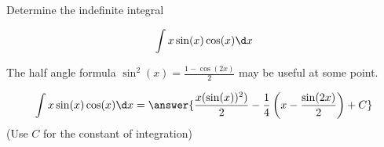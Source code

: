\documentclass{ximera}
\author{Jason Miller}
\begin{document}
\begin{exercise}
Determine the indefinite integral 

\[
\int x\sin(x) \cos(x) \d x
\]

The half angle formula $\sin^{2}(x)= \frac{1-\cos(2x)}{2}$ may be useful at some point. 

\[
\int x \sin(x) \cos(x) \d x= \answer{  \frac{x (\sin(x))^{2})}{2} -\frac{1}{4} \left( x- \frac{ \sin(2x)}{2} \right) +C} 
\]
(Use $C$ for the constant of integration)

\end{exercise}
\end{document}
